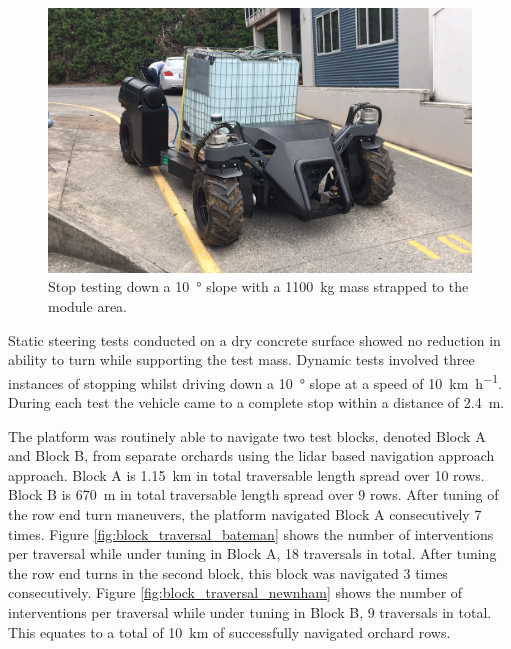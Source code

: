 \documentclass[preprint,authoryear,12pt]{elsarticle}
\begin{document}
    \begin{figure}[htb]
        \centering
        \includegraphics[width=\linewidth]{imgs/photos/stopTesting.jpg}
        \caption{
            Stop testing down a \SI{10}{\degree} slope with a \SI{1100}{\kilo\gram} mass strapped to the module area.
        }
        \label{fig:suzy_testing}
    \end{figure}

    Static steering tests conducted on a dry concrete surface showed no reduction in ability to turn while supporting the test mass.
    Dynamic tests involved three instances of stopping whilst driving down a \SI{10}{\degree} slope at a speed of \SI{10}{\kilo\meter\per\hour}.
    During each test the vehicle came to a complete stop within a distance of \SI{2.4}{\meter}.

    The platform was routinely able to navigate two test blocks, denoted Block A and Block B, from separate orchards using the lidar based navigation approach approach.
    Block A is \SI{1.15}{\kilo\meter} in total traversable length spread over 10 rows.
    Block B is \SI{670}{\meter} in total traversable length spread over 9 rows.
    After tuning of the row end turn maneuvers, the platform navigated Block A consecutively 7 times.
    Figure \ref{fig:block_traversal_bateman} shows the number of interventions per traversal while under tuning in Block A, 18 traversals in total.
    After tuning the row end turns in the second block, this block was navigated 3 times consecutively.
    Figure \ref{fig:block_traversal_newnham} shows the number of interventions per traversal while under tuning in Block B, 9 traversals in total.
    This equates to a total of \SI{10}{\kilo\meter} of successfully navigated orchard rows.
\end{document}
